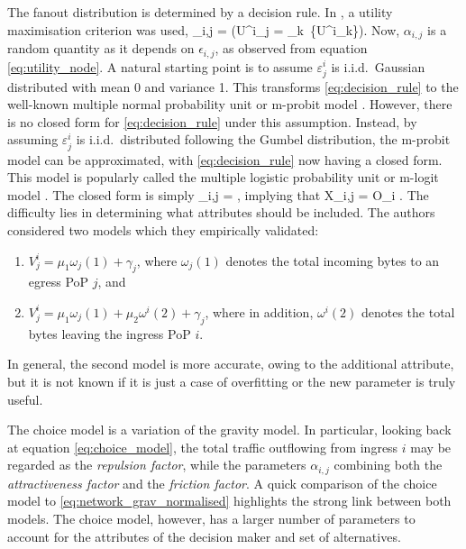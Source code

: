 The fanout distribution is determined by a decision rule. In \cite{Medina02TMdirections}, a utility maximisation criterion 
was used,
\be
\alpha_{i,j} =  \Pr\left(U^i_j = \max_{k\in\cC}\  \{U^i_k\}\right).
\label{eq:decision_rule}
\ee
Now, $\alpha_{i,j}$ is a random quantity as it depends on $\epsilon_{i,j}$, as observed from equation \autoref{eq:utility_node}. 
A natural starting point is to assume $\varepsilon^i_j$ is i.i.d.~Gaussian distributed with mean 0 and variance 1. This
transforms \autoref{eq:decision_rule} to the well-known multiple normal probability unit or m-probit model
\cite{McCullagh89GenLin}. However, there is no closed form for \autoref{eq:decision_rule} under this assumption. Instead, by
assuming $\varepsilon^i_j$ is i.i.d.~distributed following the Gumbel distribution, the m-probit model can be approximated,
with  \autoref{eq:decision_rule} now having a closed form. This model is popularly called the multiple logistic probability
unit or m-logit model \cite{McCullagh89GenLin}. The closed form is simply
\be
\alpha_{i,j} = ,
\label{eq:logit}
\ee
implying that
\be
X_{i,j} = O_i .
\label{eq:choice_model_logit}
\ee
The difficulty lies in determining what attributes should be included. The authors considered two models which they empirically 
validated:
\begin{enumerate}
\item $V^i_j = \mu_1 \omega_j(1) + \gamma_j$, where $\omega_j(1)$ denotes the total incoming bytes to an egress PoP $j$, and
\item $V^i_j = \mu_1 \omega_j(1) +\mu_2 \omega^i(2) + \gamma_j$, where in addition, $\omega^i(2)$ denotes the total bytes 
leaving the ingress PoP $i$.
\end{enumerate}
In general, the second model is more accurate, owing to the additional attribute, but it is not known if it is just a case of overfitting 
or the new parameter is truly useful. 

The choice model is a variation of the gravity model. In particular, looking back at 
equation \autoref{eq:choice_model}, the total traffic outflowing from ingress $i$ may be regarded as the \emph{repulsion
factor}, while the parameters $\alpha_{i,j}$ combining both the \emph{attractiveness factor} and the \emph{friction factor}. A
quick comparison of the choice model to \autoref{eq:network_grav_normalised} highlights the strong link between both models. 
The choice model, however, has a larger number of parameters to account for the attributes of the decision maker and set of 
alternatives.

